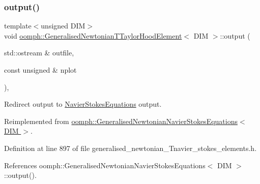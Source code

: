 \mbox{\label{classoomph_1_1GeneralisedNewtonianTTaylorHoodElement_a2c0b32513bf821e1b86efecfceaf2b08}} 
\subsubsection{\texorpdfstring{output()}{output()}\hspace{0.1cm}{\footnotesize\ttfamily [2/4]}}
{\footnotesize\ttfamily template$<$unsigned D\+IM$>$ \\
void \hyperlink{classoomph_1_1GeneralisedNewtonianTTaylorHoodElement}{oomph\+::\+Generalised\+Newtonian\+T\+Taylor\+Hood\+Element}$<$ D\+IM $>$\+::output (\begin{DoxyParamCaption}\item[{std\+::ostream \&}]{outfile,  }\item[{const unsigned \&}]{nplot }\end{DoxyParamCaption})\hspace{0.3cm}{\ttfamily [inline]}, {\ttfamily [virtual]}}



Redirect output to \hyperlink{classoomph_1_1NavierStokesEquations}{Navier\+Stokes\+Equations} output. 



Reimplemented from \hyperlink{classoomph_1_1GeneralisedNewtonianNavierStokesEquations_aadb72645b2396e206fc7765114364095}{oomph\+::\+Generalised\+Newtonian\+Navier\+Stokes\+Equations$<$ D\+I\+M $>$}.



Definition at line 897 of file generalised\+\_\+newtonian\+\_\+\+Tnavier\+\_\+stokes\+\_\+elements.\+h.



References oomph\+::\+Generalised\+Newtonian\+Navier\+Stokes\+Equations$<$ D\+I\+M $>$\+::output().

\mbox{\label{classoomph_1_1GeneralisedNewtonianTTaylorHoodElement_a4792f7006a06e705cf7d54c7933c1375}} 
